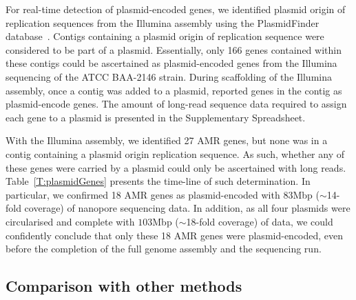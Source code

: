 For real-time detection of plasmid-encoded genes, we identified plasmid origin
of replication sequences from the Illumina assembly using the PlasmidFinder
database~\cite{CarattoliZG2014}. Contigs containing a plasmid origin of
replication sequence were considered to be part of a plasmid. Essentially, only 166
genes contained within these contigs could be ascertained as plasmid-encoded 
genes from the Illumina sequencing of the \kp{} ATCC BAA-2146 strain. During 
scaffolding of the Illumina assembly, once a contig was added to a plasmid,
\npscarf{} reported genes in the contig as plasmid-encode genes. The amount of 
long-read sequence data required to assign each gene to a plasmid is presented in 
the Supplementary Spreadsheet.  

With the Illumina assembly, we identified 27 AMR genes,  but none was in a
contig containing a plasmid origin replication sequence. As such, whether any 
of these genes were carried by a plasmid could only be ascertained with long
reads. Table~\ref{T:plasmidGenes} presents the time-line of such determination.
In particular, we confirmed 18 AMR genes as plasmid-encoded with $83$Mbp
($\sim$14-fold coverage) of nanopore sequencing data. In addition, as all four
plasmids were circularised and complete with $103$Mbp ($\sim$18-fold coverage) of
data, we could confidently conclude that only these 18 AMR genes were
plasmid-encoded, even before the completion of the full genome assembly and the
sequencing run.

\subsection{Comparison with other methods}

